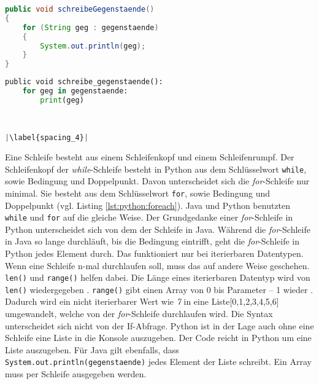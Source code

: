 \begin{minipage}{.5\linewidth}
\begin{lstlisting}[language=java,caption={foreach-Schleife Java},captionpos=b,label={lst:java:foreach},frame=none]
public void schreibeGegenstaende()
{
    for (String geg : gegenstaende)
    {
        System.out.println(geg);
    }
}
\end{lstlisting}
\end{minipage}
\begin{minipage}{.5\linewidth}
\begin{lstlisting}[language=python,caption={foreach-Schleife Python},captionpos=b,label={lst:python:foreach},frame=l,escapechar=|]
public void schreibe_gegenstaende():
    for geg in gegenstaende:
        print(geg)
        
        

|\label{spacing_4}|
\end{lstlisting}
\end{minipage}

Eine Schleife besteht aus einem Schleifenkopf und einem Schleifenrumpf. Der Schleifenkopf der \textit{while}-Schleife besteht in Python aus dem Schlüsselwort \texttt{while}, sowie Bedingung und Doppelpunkt. Davon unterscheidet sich die \textit{for}-Schleife nur minimal. Sie besteht aus dem Schlüsselwort \texttt{for}, sowie Bedingung und Doppelpunkt (vgl. Listing \ref{lst:python:foreach}). Java und Python benutzten \texttt{while} und \texttt{for} auf die gleiche Weise. Der Grundgedanke einer \textit{for}-Schleife in Python unterscheidet sich von dem der Schleife in Java. Während die \textit{for}-Schleife in Java so lange durchläuft, bis die Bedingung eintrifft, geht die \textit{for}-Schleife in Python jedes Element durch. Das funktioniert nur bei iterierbaren Datentypen. Wenn eine Schleife n-mal durchlaufen soll, muss das auf andere Weise geschehen. \texttt{len()} und \texttt{range()} helfen dabei. Die Länge eines iterierbaren Datentyp wird von \texttt{len()} wiedergegeben \cite{w3school_len}. \texttt{range()} gibt einen Array von 0 bis Parameter – 1 wieder \cite{w3school_range}. Dadurch wird ein nicht iterierbarer Wert wie \textit{7} in eine Liste[0,1,2,3,4,5,6] umgewandelt, welche von der \textit{for}-Schleife durchlaufen wird. Die Syntax unterscheidet sich nicht von der If-Abfrage. Python ist in der Lage auch ohne eine Schleife eine Liste in die Konsole auszugeben. Der Code  reicht in Python um eine Liste auszugeben. Für Java gilt ebenfalls, dass \texttt{System.out.println(gegenstaende)} jedes Element der Liste schreibt. Ein Array muss per Schleife ausgegeben werden. \cite{Louis:2010}\cite{Python3:Buch}
\par
